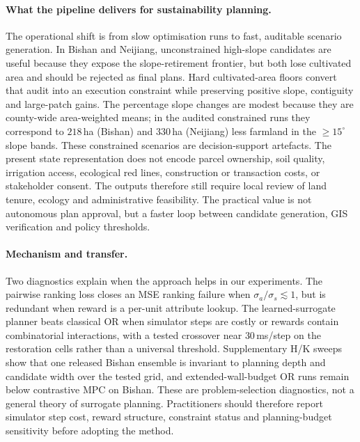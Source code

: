 \documentclass[11pt]{article}
\begin{document}
\paragraph{What the pipeline delivers for sustainability planning.} The operational shift is from slow optimisation runs to fast, auditable scenario generation. In Bishan and Neijiang, unconstrained high-slope candidates are useful because they expose the slope-retirement frontier, but both lose cultivated area and should be rejected as final plans. Hard cultivated-area floors convert that audit into an execution constraint while preserving positive slope, contiguity and large-patch gains. The percentage slope changes are modest because they are county-wide area-weighted means; in the audited constrained runs they correspond to $218$\,ha (Bishan) and $330$\,ha (Neijiang) less farmland in the $\geq 15^\circ$ slope bands. These constrained scenarios are decision-support artefacts. The present state representation does not encode parcel ownership, soil quality, irrigation access, ecological red lines, construction or transaction costs, or stakeholder consent. The outputs therefore still require local review of land tenure, ecology and administrative feasibility. The practical value is not autonomous plan approval, but a faster loop between candidate generation, GIS verification and policy thresholds.

\paragraph{Mechanism and transfer.} Two diagnostics explain when the approach helps in our experiments. The pairwise ranking loss closes an MSE ranking failure when $\sigma_a/\sigma_s \!\lesssim\! 1$, but is redundant when reward is a per-unit attribute lookup. The learned-surrogate planner beats classical OR when simulator steps are costly or rewards contain combinatorial interactions, with a tested crossover near $30$\,ms/step on the restoration cells rather than a universal threshold. Supplementary H/K sweeps show that one released Bishan ensemble is invariant to planning depth and candidate width over the tested grid, and extended-wall-budget OR runs remain below contrastive MPC on Bishan. These are problem-selection diagnostics, not a general theory of surrogate planning. Practitioners should therefore report simulator step cost, reward structure, constraint status and planning-budget sensitivity before adopting the method.
\end{document}
